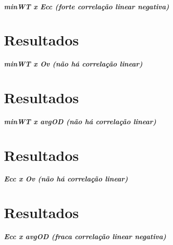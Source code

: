 \subparagraph*{min\+WT x Ecc (forte correlação linear negativa)}

\subsection*{}





\section*{Resultados}

\subparagraph*{min\+WT x Ov (não há correlação linear)}

\subsection*{}





\section*{Resultados}

\subparagraph*{min\+WT x avg\+OD (não há correlação linear)}

\subsection*{}





\section*{Resultados}

\subparagraph*{Ecc x Ov (não há correlação linear)}

\subsection*{}





\section*{Resultados}

\subparagraph*{Ecc x avg\+OD (fraca correlação linear negativa)}

\subsection*{}





